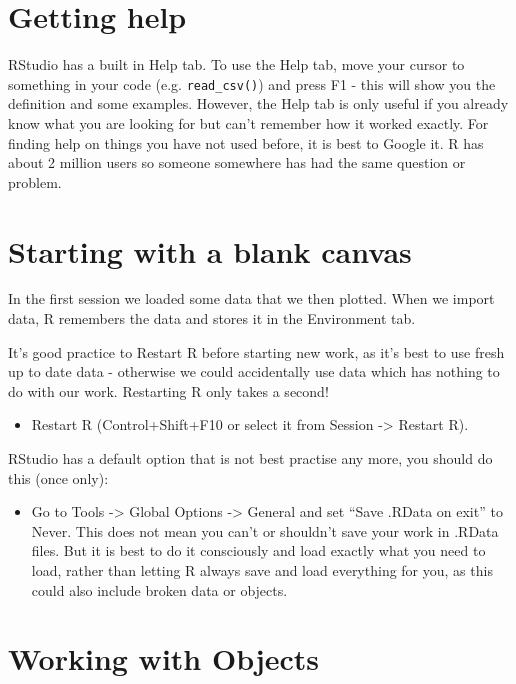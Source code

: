 \documentclass[]{book}
\providecommand{\tightlist}{%
  \setlength{\itemsep}{0pt}\setlength{\parskip}{0pt}}
\begin{document}
\section{Getting help}\label{getting-help}

RStudio has a built in Help tab. To use the Help tab, move your cursor
to something in your code (e.g. \texttt{read\_csv()}) and press F1 -
this will show you the definition and some examples. However, the Help
tab is only useful if you already know what you are looking for but
can't remember how it worked exactly. For finding help on things you
have not used before, it is best to Google it. R has about 2 million
users so someone somewhere has had the same question or problem.

\section{Starting with a blank
canvas}\label{starting-with-a-blank-canvas}

In the first session we loaded some data that we then plotted. When we
import data, R remembers the data and stores it in the Environment tab.

It's good practice to Restart R before starting new work, as it's best
to use fresh up to date data - otherwise we could accidentally use data
which has nothing to do with our work. Restarting R only takes a second!

\begin{itemize}
\tightlist
\item
  Restart R (Control+Shift+F10 or select it from Session -\textgreater{}
  Restart R).
\end{itemize}

RStudio has a default option that is not best practise any more, you
should do this (once only):

\begin{itemize}
\tightlist
\item
  Go to Tools -\textgreater{} Global Options -\textgreater{} General and
  set ``Save .RData on exit'' to Never. This does not mean you can't or
  shouldn't save your work in .RData files. But it is best to do it
  consciously and load exactly what you need to load, rather than
  letting R always save and load everything for you, as this could also
  include broken data or objects.
\end{itemize}

\section{Working with Objects}\label{working-with-objects}
\end{document}
